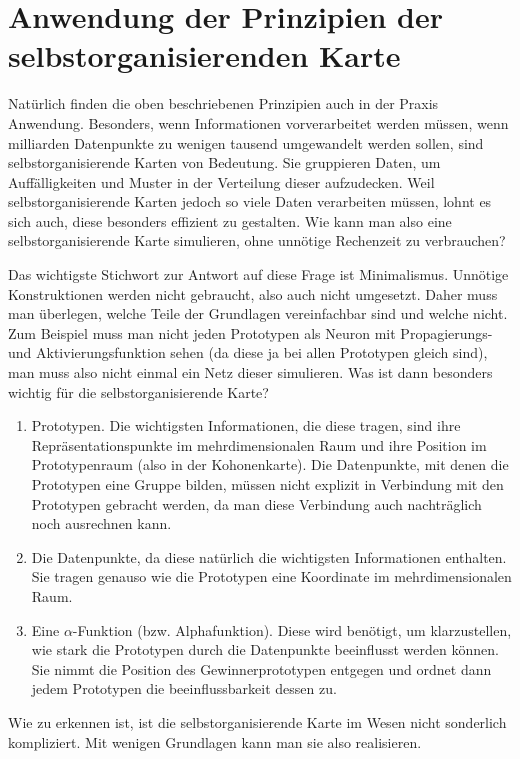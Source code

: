\documentclass[twoside,a4paper,draft]{article}
\begin{document}
\section{Anwendung der Prinzipien der selbstorganisierenden Karte}

Natürlich finden die oben beschriebenen Prinzipien auch in der Praxis Anwendung. Besonders, wenn Informationen vorverarbeitet werden müssen, wenn milliarden Datenpunkte zu wenigen tausend umgewandelt werden sollen, sind selbstorganisierende Karten von Bedeutung. Sie gruppieren Daten, um Auffälligkeiten und Muster in der Verteilung dieser aufzudecken. Weil selbstorganisierende Karten jedoch so viele Daten verarbeiten müssen, lohnt es sich auch, diese besonders effizient zu gestalten. Wie kann man also eine selbstorganisierende Karte simulieren, ohne unnötige Rechenzeit zu verbrauchen?

Das wichtigste Stichwort zur Antwort auf diese Frage ist Minimalismus. Unnötige Konstruktionen werden nicht gebraucht, also auch nicht umgesetzt. Daher muss man überlegen, welche Teile der Grundlagen vereinfachbar sind und welche nicht. Zum Beispiel muss man nicht jeden Prototypen als Neuron mit Propagierungs- und Aktivierungsfunktion sehen (da diese ja bei allen Prototypen gleich sind), man muss also nicht einmal ein Netz dieser simulieren. Was ist dann besonders wichtig für die selbstorganisierende Karte?

\begin{enumerate}
\item Prototypen. Die wichtigsten Informationen, die diese tragen, sind ihre Repräsentationspunkte im mehrdimensionalen Raum und ihre Position im Prototypenraum (also in der Kohonenkarte). Die Datenpunkte, mit denen die Prototypen eine Gruppe bilden, müssen nicht explizit in Verbindung mit den Prototypen gebracht werden, da man diese Verbindung auch nachträglich noch ausrechnen kann.
\item Die Datenpunkte, da diese natürlich die wichtigsten Informationen enthalten. Sie tragen genauso wie die Prototypen eine Koordinate im mehrdimensionalen Raum.
\item Eine \(\alpha\)-Funktion (bzw. Alphafunktion). Diese wird benötigt, um klarzustellen, wie stark die Prototypen durch die Datenpunkte beeinflusst werden können. Sie nimmt die Position des Gewinnerprototypen entgegen und ordnet dann jedem Prototypen die beeinflussbarkeit dessen zu.
\end{enumerate}

Wie zu erkennen ist, ist die selbstorganisierende Karte im Wesen nicht sonderlich kompliziert. Mit wenigen Grundlagen kann man sie also realisieren.
\end{document}
